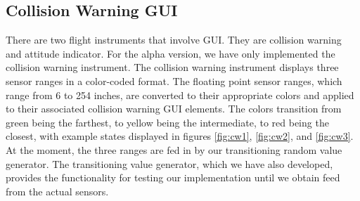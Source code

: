 \documentclass[onecolumn, oneside, letterpaper, draftclsnofoot, 10pt, compsoc]{IEEEtran}
\begin{document}
\subsection{Collision Warning GUI}
\noindent
There are two flight instruments that involve GUI. They are collision warning and attitude indicator. For the alpha version, we have only implemented the collision warning instrument. The collision warning instrument displays three sensor ranges in a color-coded format. The floating point sensor ranges, which range from 6 to 254 inches, are converted to their appropriate colors and applied to their associated collision warning GUI elements. The colors transition from green being the farthest, to yellow being the intermediate, to red being the closest, with example states displayed in figures \ref{fig:cw1}, \ref{fig:cw2}, and \ref{fig:cw3}. At the moment, the three ranges are fed in by our transitioning random value generator. The transitioning value generator, which we have also developed, provides the functionality for testing our implementation until we obtain feed from the actual sensors.
\end{document}
